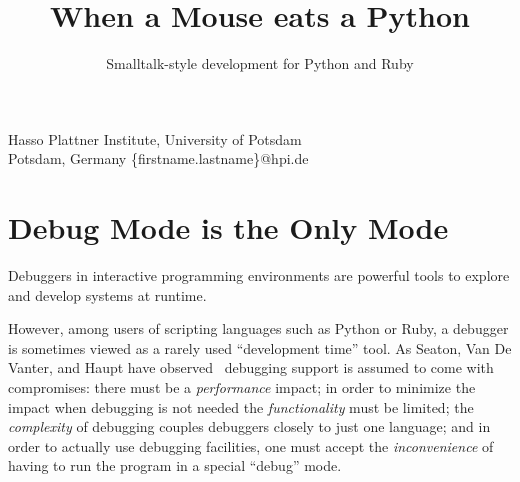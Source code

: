 \documentclass[10pt,numbers]{sigplanconf}
\begin{document}



\title{When a Mouse eats a Python}
\subtitle{Smalltalk-style development for Python and Ruby}


           {Hasso Plattner Institute, University of Potsdam\\Potsdam, Germany}
           {\{firstname.lastname\}@hpi.de}

\maketitle





\section{Debug Mode is the Only Mode}

Debuggers in interactive programming environments are powerful tools to explore
and develop systems at runtime.

However, among users of scripting languages such as Python or Ruby, a debugger
is sometimes viewed as a rarely used ``development time'' tool. As Seaton, Van
De Vanter, and Haupt have observed~\cite{Seaton:2014:DFS:2617548.2617550}
debugging support is assumed to come with compromises: there must be a
\emph{performance} impact; in order to minimize the impact when debugging is not
needed the \emph{functionality} must be limited; the \emph{complexity} of
debugging couples debuggers closely to just one language; and in order to
actually use debugging facilities, one must accept the \emph{inconvenience} of
having to run the program in a special ``debug'' mode.
\end{document}
